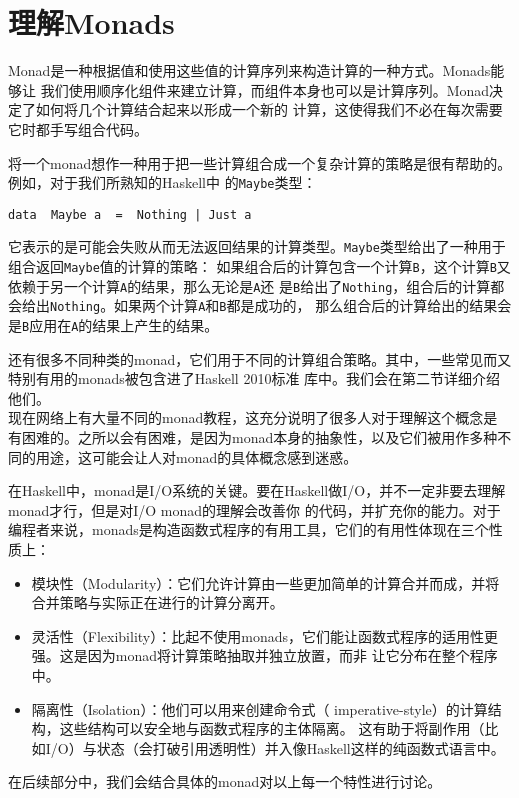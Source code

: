 \section{理解Monads}
Monad是一种根据值和使用这些值的计算序列来构造计算的一种方式。Monads能够让
我们使用顺序化组件来建立计算，而组件本身也可以是计算序列。Monad决定了如何将几个计算结合起来以形成一个新的
计算，这使得我们不必在每次需要它时都手写组合代码。

\indent{}将一个monad想作一种用于把一些计算组合成一个复杂计算的策略是很有帮助的。例如，对于我们所熟知的Haskell中
的\texttt{Maybe}类型：
\begin{verbatim}
data  Maybe a  =  Nothing | Just a
\end{verbatim}
它表示的是可能会失败从而无法返回结果的计算类型。\texttt{Maybe}类型给出了一种用于组合返回\texttt{Maybe}值的计算的策略：
如果组合后的计算包含一个计算\texttt{B}，这个计算\texttt{B}又依赖于另一个计算\texttt{A}的结果，那么无论是\texttt{A}还
是\texttt{B}给出了\texttt{Nothing}，组合后的计算都会给出\texttt{Nothing}。如果两个计算\texttt{A}和\texttt{B}都是成功的，
那么组合后的计算给出的结果会是\texttt{B}应用在\texttt{A}的结果上产生的结果。

\indent{}还有很多不同种类的monad，它们用于不同的计算组合策略。其中，一些常见而又特别有用的monads被包含进了Haskell 2010标准
库中。我们会在第二节详细介绍他们。
~\\

现在网络上有大量不同的monad教程，这充分说明了很多人对于理解这个概念是
有困难的。之所以会有困难，是因为monad本身的抽象性，以及它们被用作多种不同的用途，这可能会让人对monad的具体概念感到迷惑。

\indent{}在Haskell中，monad是I/O系统的关键。要在Haskell做I/O，并不一定非要去理解monad才行，但是对I/O monad的理解会改善你
的代码，并扩充你的能力。对于编程者来说，monads是构造函数式程序的有用工具，它们的有用性体现在三个性质上：
\begin{itemize}
\item 模块性（Modularity）：它们允许计算由一些更加简单的计算合并而成，并将合并策略与实际正在进行的计算分离开。
\item 灵活性（Flexibility）：比起不使用monads，它们能让函数式程序的适用性更强。这是因为monad将计算策略抽取并独立放置，而非
让它分布在整个程序中。
\item 隔离性（Isolation）：他们可以用来创建命令式（ imperative-style）的计算结构，这些结构可以安全地与函数式程序的主体隔离。
这有助于将副作用（比如I/O）与状态（会打破引用透明性）并入像Haskell这样的纯函数式语言中。
\end{itemize}
\noindent{}在后续部分中，我们会结合具体的monad对以上每一个特性进行讨论。

